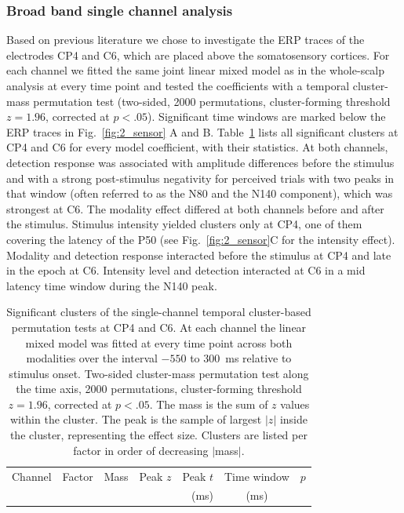 \documentclass[11pt,a4paper,onecolumn]{article}
\begin{document}
\subsubsection*{Broad band single channel analysis}
Based on previous literature we chose to investigate the ERP traces of the electrodes CP4 and C6, which are placed above the somatosensory cortices.
For each channel we fitted the same joint linear mixed model as in the whole-scalp analysis at every time point and tested the coefficients with a temporal cluster-mass permutation test (two-sided, 2000 permutations, cluster-forming threshold $z = 1.96$, corrected at $p < .05$). Significant time windows are marked below the ERP traces in Fig.~\ref{fig:2_sensor} A and B. Table~\ref{tab:clusters_single_channel} lists all significant clusters at CP4 and C6 for every model coefficient, with their statistics. At both channels, detection response was associated with amplitude differences before the stimulus and with a strong post-stimulus negativity for perceived trials with two peaks in that window (often referred to as the N80 and the N140 component), which was strongest at C6.
The modality effect differed at both channels before and after the stimulus.
Stimulus intensity yielded clusters only at CP4, one of them covering the latency of the P50 (see Fig.~\ref{fig:2_sensor}C for the intensity effect).
Modality and detection response interacted before the stimulus at CP4 and late in the epoch at C6. Intensity level and detection interacted at C6 in a mid latency time window during the N140 peak.

\begin{table}[H]
  \centering
  \small
  \setlength{\tabcolsep}{4pt}
  \caption{Significant clusters of the single-channel temporal cluster-based permutation tests at CP4 and C6. At each channel the linear mixed model was fitted at every time point across both modalities over the interval $-550$ to $300$~ms relative to stimulus onset. Two-sided cluster-mass permutation test along the time axis, 2000 permutations, cluster-forming threshold $z = 1.96$, corrected at $p < .05$. The mass is the sum of $z$ values within the cluster. The peak is the sample of largest $|z|$ inside the cluster, representing the effect size. Clusters are listed per factor in order of decreasing $|$mass$|$.}
  \label{tab:clusters_single_channel}
  \begin{tabular}{llrrrcr}
    \toprule
    Channel & Factor & Mass & Peak $z$ & Peak $t$ & Time window & $p$ \\
     &  &  &  & (ms) & (ms) &  \\
    \midrule
    

  \end{tabular}
\end{table}
\end{document}
